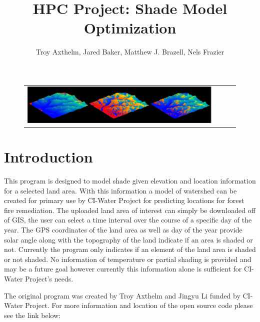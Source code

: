 \documentclass[]{article}%
\title{HPC Project: Shade Model Optimization}
\author{Troy Axthelm, Jared Baker, Matthew J. Brazell, Nels Frazier}
\begin{document}
\maketitle
\begin{figure}[H]
\centering
  \begin{tabular}{@{}cccc@{}}
    \includegraphics[width=.75\textwidth]{./figures/titleBar.png} 
  \end{tabular}
  \caption{}
  \label{}
\end{figure}




\section{Introduction}


This program is designed to model shade given elevation and location information for a selected land area. With this information a model of watershed can be created for primary use by CI-Water Project for predicting locations for forest fire remediation. The uploaded land area of interest can simply be downloaded off of GIS, the user can select a time interval over the course of a specific day of the year. The GPS coordinates of the land area as well as day of the year provide solar angle along with the topography of the land indicate if an area is shaded or not. Currently the program  only indicates if an element of the land area is shaded or not shaded. No information of temperature or partial shading is provided and may be a future goal however currently this information alone is sufficient for CI-Water Project's needs.

The original program was created by Troy Axthelm and Jingyu Li  funded by CI-Water Project. For more information and location of the open source code please see the link below:
\end{document}
